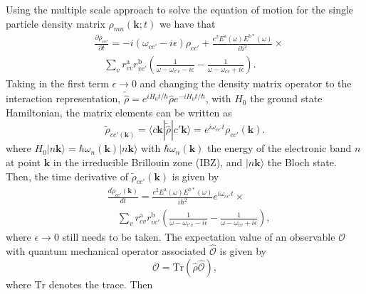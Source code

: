 \documentclass[prb,11pt,tightenlines,twocolumn,aps]{revtex4-1}
\begin{document}
Using the multiple scale approach to solve the equation of motion for the
single particle density matrix $\rho_{mn}(\mathbf{k};t)$ we have that 
\begin{equation*}
\begin{aligned}
&\frac{\partial \rho_{cc'}}{\partial t} =
-i (\omega_{cc'} - i \epsilon) \rho_{cc'}
+
\frac{e^{2}E^{\mathrm{a}}(\omega)E^{\mathrm{b*}}(\omega)}
{i \hbar^{2}}
\times \\
& \quad \sum_{v}r^{\mathrm{a}}_{cv} r^{\mathrm{b}}_{vc'}
\left( \frac{1}{\omega - \omega_{c'v} - i \epsilon} 
- 
\frac{1}{\omega - \omega_{cv} + i \epsilon} \right).
\end{aligned}
\end{equation*}
Taking in the first term $\epsilon \rightarrow 0$ and changing the density
matrix operator to the interaction representation, $\tilde{\hat{\rho}} = e^{iH_
{0}t/\hbar} \hat{\rho} e^{-iH_{0}t/\hbar}$, with $H_{0}$ the ground state
Hamiltonian, the matrix elements can be written as
\begin{equation*}
\tilde{\rho}_{cc'(\mathbf{k})} 
= \langle c\mathbf{k}| \tilde{\hat{\rho}} | c'\mathbf{k} \rangle
= e^{i \omega_{cc'}t} \rho_{cc'}(\mathbf{k}).
\end{equation*}
where $H_{0}|n\mathbf{k}\rangle = \hbar \omega_{n}(\mathbf{k})|n
\mathbf{k}\rangle$ with $\hbar \omega_{n}(\mathbf{k})$ the energy of the
electronic band $n$ at point $\mathbf{k}$ in the irreducible Brillouin zone
(IBZ), and $|n\mathbf{k}\rangle$ the Bloch state. Then, the time derivative of
$\tilde{\rho}_{cc'}(\mathbf{k})$ is given by 
\begin{equation}\label{eq:derden}
\begin{aligned}
&\frac{d\tilde{\rho}_{cc'}(\mathbf{k})}{dt} 
= 
\frac{e^{2} E^\mathrm{a}(\omega) E^{\mathrm{b*}}(\omega)}{i\hbar^{2}} 
e^{i\omega_{cc'}t} 
\times \\
&\quad \sum_{v}r^{\mathrm{a}}_{cv} r^{\mathrm{b}}_{vc'}
\left( \frac{1}{\omega - \omega_{c'v} - i \epsilon} 
- 
\frac{1}{\omega - \omega_{cv} + i \epsilon} \right),
\end{aligned}
\end{equation}
where $\epsilon \rightarrow 0$ still needs to be taken. 
% 
The expectation value of an observable $\mathcal{O}$ with quantum mechanical
operator associated $\hat{\mathcal{O}}$ is given by
\begin{equation}\label{eq:trace}
\mathcal{O} = \mathrm{Tr}(\hat{\rho}\hat{\mathcal{O}}),
\end{equation}
where $\mathrm{Tr}$ denotes the trace. Then
\end{document}
